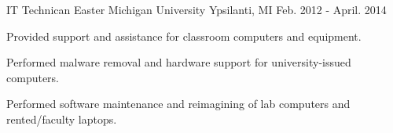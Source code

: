 \begin{cventries}
\cventry
{IT Technican} %
{Easter Michigan University} %
{Ypsilanti, MI} %
{Feb. 2012 - April. 2014} %
{ %
\begin{cvitems}
\item {Provided support and assistance for classroom computers and equipment.}
\item {Performed malware removal and hardware support for university-issued computers.}
\item {Performed software maintenance and reimagining of lab computers and rented/faculty laptops.}
\end{cvitems} 
}
\end{cventries}